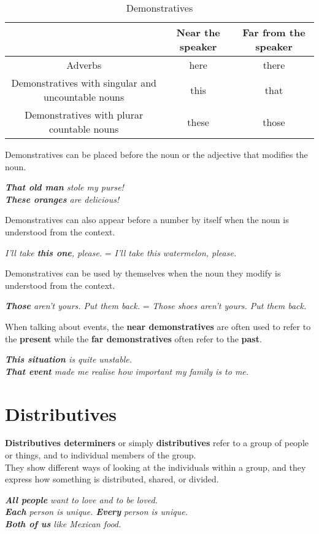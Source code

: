 \documentclass[hidelinks,10pt,a4paper]{article}
\begin{document}
\begin{table}[h]
\begin{center}
\begin{tabular}{|c|c|c|}
		\hline
		     	 & \textbf{Near the speaker} & \textbf{Far from the speaker} \\ \hline
		Adverbs  & here & there \\ \hline
		Demonstratives with singular and uncountable nouns & this & that \\ \hline
		Demonstratives with plurar countable nouns & these & those\\ \hline
\end{tabular}
\end{center}
\caption{\label{tab:nouns7}Demonstratives}
\end{table}
Demonstratives can be placed before the noun or the adjective that modifies the noun.
\begin{center}
\textit{ \textbf{That old man} stole my purse!\\
\textbf{These oranges} are delicious!}
\end{center}
Demonstratives can also appear before a number by itself when the noun is understood from the context.
\begin{center}
\textit{I'll take \textbf{this one}, please.} = \textit{I'll take this watermelon, please.}
\end{center}
Demonstratives can be used by themselves when the noun they modify is understood from the context.
\begin{center}
\textit{ \textbf{Those} aren't yours. Put them back.} = \textit{Those shoes aren't yours. Put them back.}
\end{center}
When talking about events, the \textbf{near demonstratives} are often used to refer to the \textbf{present} while the \textbf{far demonstratives} often refer to the \textbf{past}.
\begin{center}
\textit{ \textbf{This situation} is quite unstable. \\
\textbf{That event} made me realise how important my family is to me.}
\end{center}

\section{Distributives}
\textbf{Distributives determiners} or simply \textbf{distributives} refer to a group of people or things, and to individual members of the group.\\
\indent They show different ways of looking at the individuals within a group, and they express how something is distributed, shared, or divided.
\begin{center}
\textit{ \textbf{All people} want to love and to be loved.\\
\textbf{Each} person is unique. \textbf{Every} person is unique.\\
\textbf{Both of us} like Mexican food.}
\end{center}
\end{document}
